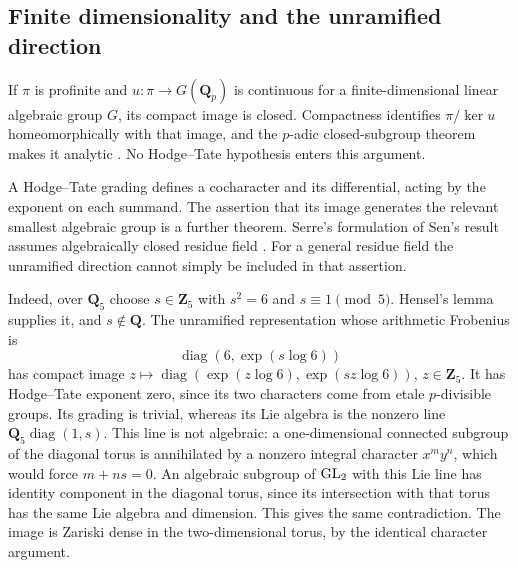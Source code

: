\documentclass[11pt]{article}
\theoremstyle{definition}\newtheorem{definition}[theorem]{Definition}
\theoremstyle{remark}\newtheorem{remark}[theorem]{Remark}
\newcommand{\Q}{\mathbf Q}\newcommand{\Z}{\mathbf Z}
\begin{document}
\subsection{Finite dimensionality and the unramified direction}
If $\pi$ is profinite and $u:\pi\to G(\Q_p)$ is continuous for a finite-dimensional linear algebraic group $G$, its compact image is closed. Compactness identifies $\pi/\ker u$ homeomorphically with that image, and the $p$-adic closed-subgroup theorem makes it analytic \cite[Corollary~19.14, p.~97]{PstragowskiLocal}. No Hodge--Tate hypothesis enters this argument.

A Hodge--Tate grading defines a cocharacter and its differential, acting by the exponent on each summand. The assertion that its image generates the relevant smallest algebraic group is a further theorem. Serre's formulation of Sen's result assumes algebraically closed residue field \cite[\S1.1, p.~156; Theorems~1, $1'$ and 2, pp.~158--159]{SerreLocal}. For a general residue field the unramified direction cannot simply be included in that assertion.

Indeed, over $\Q_5$ choose $s\in\Z_5$ with $s^2=6$ and $s\equiv1\pmod5$. Hensel's lemma supplies it, and $s\notin\Q$. The unramified representation whose arithmetic Frobenius is
\[
              \operatorname{diag}(6,\exp(s\log6))
\]
has compact image $z\mapsto\operatorname{diag}(\exp(z\log6),\exp(sz\log6))$, $z\in\Z_5$. It has Hodge--Tate exponent zero, since its two characters come from etale $p$-divisible groups. Its grading is trivial, whereas its Lie algebra is the nonzero line $\Q_5\operatorname{diag}(1,s)$. This line is not algebraic: a one-dimensional connected subgroup of the diagonal torus is annihilated by a nonzero integral character $x^my^n$, which would force $m+ns=0$. An algebraic subgroup of $\operatorname{GL}_2$ with this Lie line has identity component in the diagonal torus, since its intersection with that torus has the same Lie algebra and dimension. This gives the same contradiction. The image is Zariski dense in the two-dimensional torus, by the identical character argument.
\end{document}
